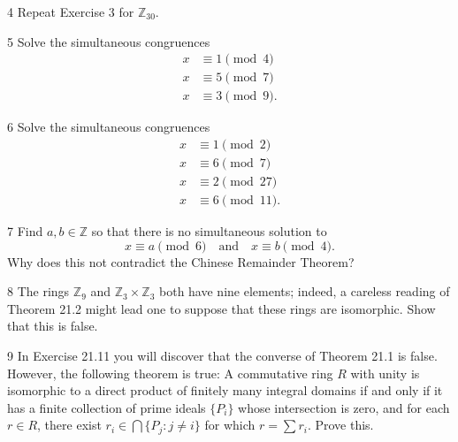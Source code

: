 \begin{problem}{4}
    Repeat Exercise 3 for $\mathbb{Z}_{30}$.
\end{problem}
\unsolved

\begin{problem}{5}
    Solve the simultaneous congruences
    \begin{align*}
        x &\equiv 1 \pmod{4} \\
        x &\equiv 5 \pmod{7} \\
        x &\equiv 3 \pmod{9}.
    \end{align*}
\end{problem}
\unsolved

\begin{problem}{6}
    Solve the simultaneous congruences
    \begin{align*}
        x &\equiv 1 \pmod{2} \\
        x &\equiv 6 \pmod{7} \\
        x &\equiv 2 \pmod{27} \\
        x &\equiv 6 \pmod{11}.
    \end{align*}
\end{problem}
\unsolved

\begin{problem}{7}
    Find $a, b \in \mathbb{Z}$ so that there is no simultaneous solution to
    \[x \equiv a \pmod{6} \quad\text{and}\quad x \equiv b \pmod{4}.\]
    Why does this not contradict the Chinese Remainder Theorem?
\end{problem}
\unsolved

\begin{problem}{8}
    The rings $\mathbb{Z}_9$ and $\mathbb{Z}_3 \times \mathbb{Z}_3$ both have nine elements;
    indeed, a careless reading of Theorem 21.2 might lead one to suppose that these rings
    are isomorphic. Show that this is false.
\end{problem}
\unsolved

\begin{problem}{9}
    In Exercise 21.11 you will discover that the converse of Theorem 21.1 is false.
    However, the following theorem is true: A commutative ring $R$ with unity is
    isomorphic to a direct product of finitely many integral domains if and only if it
    has a finite collection of prime ideals $\{P_i\}$ whose intersection is zero, and for
    each $r \in R$, there exist $r_i \in \bigcap\{P_j : j \neq i\}$ for which
    $r = \sum r_i$. Prove this.
\end{problem}
\unsolved

